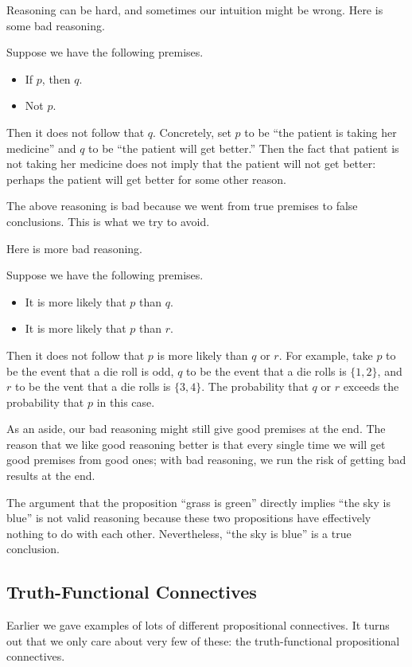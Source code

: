 Reasoning can be hard, and sometimes our intuition might be wrong. Here is some bad reasoning.
\begin{nex}
	Suppose we have the following premises.
	\begin{itemize}
		\item If $p$, then $q$.
		\item Not $p$.
	\end{itemize}
	Then it does not follow that $q$. Concretely, set $p$ to be ``the patient is taking her medicine'' and $q$ to be ``the patient will get better.'' Then the fact that patient is not taking her medicine does not imply that the patient will not get better: perhaps the patient will get better for some other reason.
\end{nex}
The above reasoning is bad because we went from true premises to false conclusions. This is what we try to avoid.

Here is more bad reasoning.
\begin{nex}
	Suppose we have the following premises.
	\begin{itemize}
		\item It is more likely that $p$ than $q$.
		\item It is more likely that $p$ than $r$.
	\end{itemize}
	Then it does not follow that $p$ is more likely than $q$ or $r$. For example, take $p$ to be the event that a die roll is odd, $q$ to be the event that a die rolls is $\{1,2\}$, and $r$ to be the vent that a die rolls is $\{3,4\}$. The probability that $q$ or $r$ exceeds the probability that $p$ in this case.
\end{nex}
As an aside, our bad reasoning might still give good premises at the end. The reason that we like good reasoning better is that every single time we will get good premises from good ones; with bad reasoning, we run the risk of getting bad results at the end.
\begin{example}
	The argument that the proposition ``grass is green'' directly implies ``the sky is blue'' is not valid reasoning because these two propositions have effectively nothing to do with each other. Nevertheless, ``the sky is blue'' is a true conclusion.
\end{example}

\subsection{Truth-Functional Connectives}
Earlier we gave examples of lots of different propositional connectives. It turns out that we only care about very few of these: the truth-functional propositional connectives.


